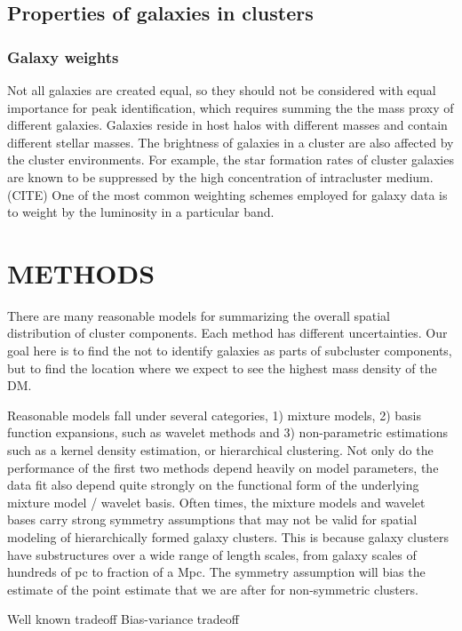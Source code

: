 \subsection{Properties of galaxies in clusters}
\subsubsection{Galaxy weights}
\label{subsubsec:galaxy_weights}
Not all galaxies are created equal, so they should not be considered with equal
importance for peak identification, which requires summing the
the mass proxy of different galaxies. Galaxies reside in host halos with different masses and 
contain different stellar masses. The brightness of galaxies in a cluster are 
also affected by the cluster environments.
For example, the star formation rates of cluster galaxies are known to be 
suppressed by the high concentration of intracluster medium. (CITE)
One of the most common weighting schemes employed for galaxy data is to weight
by the luminosity in a particular band.

\section{METHODS}\label{sec:methods}

There are many reasonable models for summarizing the overall spatial
distribution of cluster components. Each method has different uncertainties.
Our goal here is to find the  
not to identify galaxies as parts of subcluster components,
but to find the location where we expect to see the highest mass density of the
DM.

Reasonable models fall under several categories, 1) mixture models, 2) basis function
expansions, such as wavelet methods and 3) non-parametric estimations 
such as a kernel density estimation, or hierarchical clustering. 
Not only do the performance of the 
first two methods depend heavily on model parameters, 
the data fit also depend quite strongly on the functional form of 
the underlying mixture model / wavelet basis. Often times, 
the mixture models and wavelet bases 
carry strong symmetry assumptions that may not be valid for spatial modeling of 
hierarchically formed galaxy clusters. 
This is because galaxy clusters have substructures over a wide range of length
scales, from galaxy scales of hundreds of pc to fraction of a Mpc. 
The symmetry assumption will bias the estimate of the point estimate that we
are after for non-symmetric clusters.

Well known tradeoff Bias-variance tradeoff

